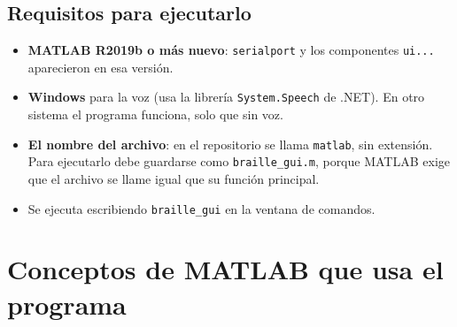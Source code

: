 \documentclass[11pt,a4paper]{article}
\newcommand{\cod}[1]{\texttt{#1}}
\begin{document}
\subsection{Requisitos para ejecutarlo}
\begin{itemize}
  \item \textbf{MATLAB R2019b o más nuevo}: \cod{serialport} y los componentes
        \cod{ui...} aparecieron en esa versión.
  \item \textbf{Windows} para la voz (usa la librería \cod{System.Speech} de .NET).
        En otro sistema el programa funciona, solo que sin voz.
  \item \textbf{El nombre del archivo}: en el repositorio se llama \cod{matlab}, sin
        extensión. Para ejecutarlo debe guardarse como \cod{braille\_gui.m}, porque
        MATLAB exige que el archivo se llame igual que su función principal.
  \item Se ejecuta escribiendo \cod{braille\_gui} en la ventana de comandos.
\end{itemize}

\section{Conceptos de MATLAB que usa el programa}
\end{document}
